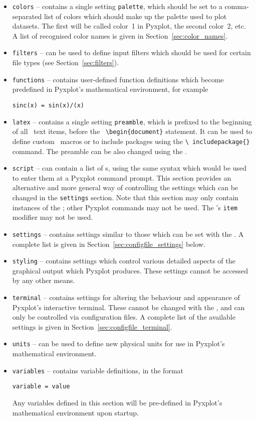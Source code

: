 \begin{itemize}
\item {\tt colors} -- contains a single setting {\tt palette}, which should be
set to a comma-separated list of colors which should make up the palette used
to plot datasets. The first will be called color~1 in Pyxplot, the second
color~2, etc. A list of recognised color names is given in
Section~\ref{sec:color_names}.
\item {\tt filters} -- can be used to define input filters which should be used
for certain file types (see Section~\ref{sec:filters}).
\item {\tt functions} -- contains user-defined function definitions which
become predefined in Pyxplot's mathematical environment, for example
\begin{verbatim}
sinc(x) = sin(x)/(x)
\end{verbatim}
\item {\tt latex} -- contains a single setting {\tt preamble}, which is
prefixed to the beginning of all \latexdcf\ text items, before the {\tt
\textbackslash begin\{document\}} statement. It can be used to define custom
\latexdcf\ macros or to include packages using the {\tt \textbackslash
includepackage\{\}} command.  The preamble can be also changed using the
.
\item {\tt script} -- can contain a list of s, using the same
syntax which would be used to enter them at a Pyxplot command prompt. This
section provides an alternative and more general way of controlling the
settings which can be changed in the {\tt settings} section. Note that this
section may only contain instances of the ; other Pyxplot
commands may not be used. The 's {\tt item} modifier may not be
used.
\item {\tt settings} -- contains settings similar to those which can be set
with the . A complete list is given in
Section~\ref{sec:configfile_settings} below.
\item {\tt styling} -- contains settings which control various detailed aspects
of the graphical output which Pyxplot produces. These settings cannot be
accessed by any other means.
\item {\tt terminal} -- contains settings for altering the behaviour and
appearance of Pyxplot's interactive terminal. These cannot be changed with the
, and can only be controlled via configuration files. A complete
list of the available settings is given in
Section~\ref{sec:configfile_terminal}.
\item {\tt units} -- can be used to define new physical units for use in
Pyxplot's mathematical environment.
\item {\tt variables} -- contains variable definitions, in the format
\begin{verbatim}
variable = value
\end{verbatim}
Any variables defined in this section will be pre-defined in Pyxplot's
mathematical environment upon startup.

\end{itemize}

